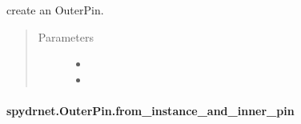 \documentclass[letterpaper,10pt,english,openany,oneside]{sphinxmanual}
\begin{document}
\begin{fulllineitems}
\label{\detokenize{reference/classes/generated/spydrnet.OuterPin.__init__:spydrnet.OuterPin.__init__}}
create an OuterPin.
\begin{quote}\begin{description}
\item[{Parameters}] \leavevmode\begin{itemize}
\item {} 

\item {} 

\end{itemize}

\end{description}\end{quote}

\end{fulllineitems}



\paragraph{spydrnet.OuterPin.from\_instance\_and\_inner\_pin}
\label{\detokenize{reference/classes/generated/spydrnet.OuterPin.from_instance_and_inner_pin:spydrnet-outerpin-from-instance-and-inner-pin}}\label{\detokenize{reference/classes/generated/spydrnet.OuterPin.from_instance_and_inner_pin::doc}}
\end{document}

